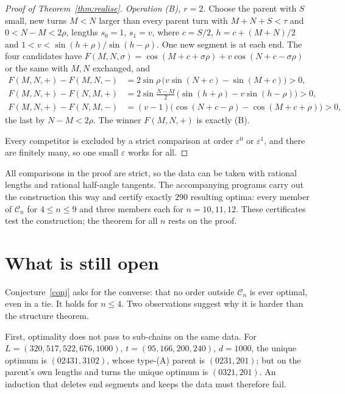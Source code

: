 \documentclass[11pt]{article}
\theoremstyle{remark}
\newcommand{\cC}{\mathcal C}
\begin{document}
\begin{proof}[Proof of Theorem~\ref{thm:realise}]
\emph{Operation (B), $r=2$.} Choose the parent with $S$ small, new turns $M<N$ larger than every parent turn with $M+N+S<\tau$ and $0<N-M<2\rho$, lengths $s_0=1$, $s_1=v$, where $c=S/2$, $h=c+(M+N)/2$ and $1<v<\sin(h+\rho)/\sin(h-\rho)$. One new segment is at each end. The four candidates have $F(M,N,\sigma)=\cos(M+c+\sigma\rho)+v\cos(N+c-\sigma\rho)$ or the same with $M,N$ exchanged, and
\begin{align*}
F(M,N,+)-F(M,N,-)&=2\sin\rho\,\bigl(v\sin(N+c)-\sin(M+c)\bigr)>0,\\
F(M,N,+)-F(N,M,+)&=2\sin\tfrac{N-M}2\,\bigl(\sin(h+\rho)-v\sin(h-\rho)\bigr)>0,\\
F(M,N,+)-F(N,M,-)&=(v-1)\bigl(\cos(N+c-\rho)-\cos(M+c+\rho)\bigr)>0 ,
\end{align*}
the last by $N-M<2\rho$. The winner $F(M,N,+)$ is exactly (B).

Every competitor is excluded by a strict comparison at order $\varepsilon^0$ or $\varepsilon^1$, and there are finitely many, so one small $\varepsilon$ works for all.
\end{proof}

All comparisons in the proof are strict, so the data can be taken with rational lengths and rational half-angle tangents. The accompanying programs carry out the construction this way and certify exactly $290$ resulting optima: every member of $\cC_n$ for $4\le n\le9$ and three members each for $n=10,11,12$. These certificates test the construction; the theorem for all $n$ rests on the proof.

\section{What is still open}\label{sec:open}

Conjecture~\ref{conj} asks for the converse: that no order outside $\cC_n$ is ever optimal, even in a tie. It holds for $n\le4$. Two observations suggest why it is harder than the structure theorem.

First, optimality does not pass to sub-chains on the same data. For $L=(320,517,522,676,1000)$, $t=(95,166,200,240)$, $d=1000$, the unique optimum is $(02431,3102)$, whose type-(A) parent is $(0231,201)$; but on the parent's own lengths and turns the unique optimum is $(0321,201)$. An induction that deletes end segments and keeps the data must therefore fail.
\end{document}
